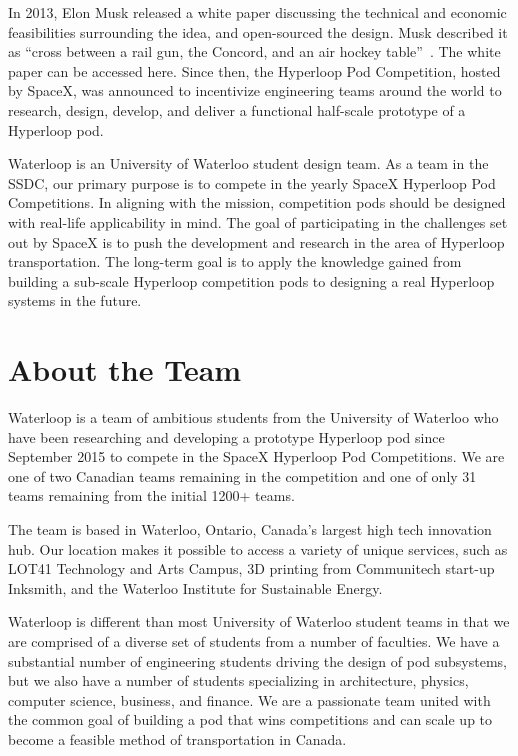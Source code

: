 \documentclass[11pt,a4paper,oldfontcommands]{memoir}
\begin{document}
   In 2013, Elon Musk released a white paper discussing the technical and economic feasibilities surrounding the idea, and open-sourced the design. Musk described it as “cross between a rail gun, the Concord, and an air hockey table”~\cite{Concorde_and_airhockey}. The white paper can be accessed here. Since then, the Hyperloop Pod Competition, hosted by SpaceX, was announced to incentivize engineering teams around the world to research, design, develop, and deliver a functional half-scale prototype of a Hyperloop pod.

   Waterloop is an University of Waterloo student design team. As a team in the SSDC, our primary purpose is to compete in the yearly SpaceX Hyperloop Pod Competitions. In aligning with the mission, competition pods should be designed with real-life applicability in mind. The goal of participating in the challenges set out by SpaceX is to push the development and research in the area of Hyperloop transportation. The long-term goal is to apply the knowledge gained from building a sub-scale Hyperloop competition pods to designing a real Hyperloop systems in the future.

   \section{About the Team}
   Waterloop is a team of ambitious students from the University of Waterloo who have been researching and developing a prototype Hyperloop pod since September 2015 to compete in the SpaceX Hyperloop Pod Competitions. We are one of two Canadian teams remaining in the competition and one of only 31 teams remaining from the initial 1200+ teams.

   The team is based in Waterloo, Ontario, Canada’s largest high tech innovation hub. Our location makes it possible to access a variety of unique services, such as LOT41 Technology and Arts Campus, 3D printing from Communitech start-up Inksmith, and the Waterloo Institute for Sustainable Energy.

   Waterloop is different than most University of Waterloo student teams in that we are comprised of a diverse set of students from a number of faculties. We have a substantial number of engineering students driving the design of pod subsystems, but we also have a number of students specializing in architecture, physics, computer science, business, and finance. We are a passionate team united with the common goal of building a pod that wins competitions and can scale up to become a feasible method of transportation in Canada.
\end{document}

